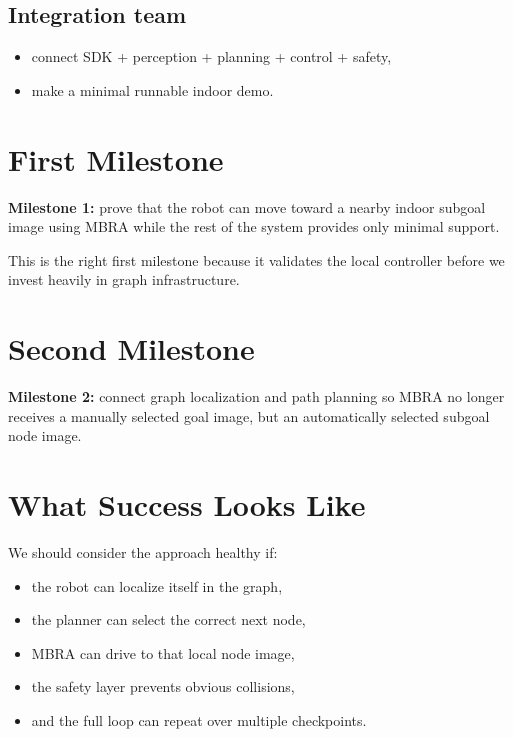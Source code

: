 \documentclass[11pt,a4paper]{article}
\begin{document}
\subsection*{Integration team}
\begin{itemize}[nosep]
  \item connect SDK + perception + planning + control + safety,
  \item make a minimal runnable indoor demo.
\end{itemize}


\section{First Milestone}

\begin{mdframed}
\textbf{Milestone 1:} prove that the robot can move toward a nearby indoor
subgoal image using MBRA while the rest of the system provides only minimal
support.
\end{mdframed}

This is the right first milestone because it validates the local controller
before we invest heavily in graph infrastructure.


\section{Second Milestone}

\begin{mdframed}
\textbf{Milestone 2:} connect graph localization and path planning so MBRA no
longer receives a manually selected goal image, but an automatically selected
subgoal node image.
\end{mdframed}


\section{What Success Looks Like}

We should consider the approach healthy if:
\begin{itemize}[nosep]
  \item the robot can localize itself in the graph,
  \item the planner can select the correct next node,
  \item MBRA can drive to that local node image,
  \item the safety layer prevents obvious collisions,
  \item and the full loop can repeat over multiple checkpoints.
\end{itemize}
\end{document}
